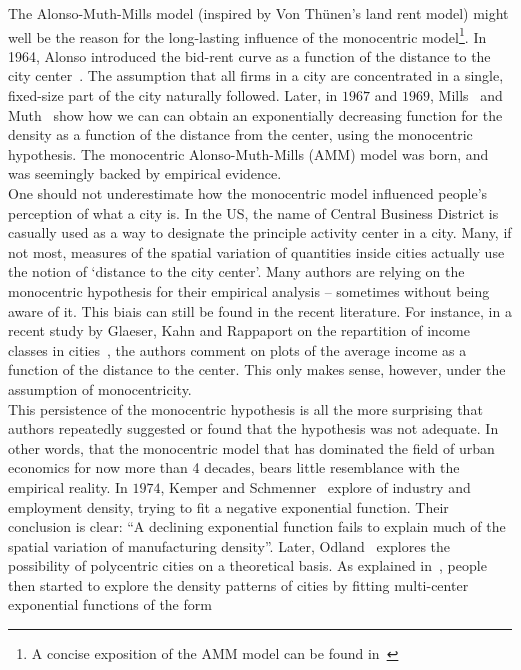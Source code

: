 The Alonso-Muth-Mills model (inspired by Von Th\"unen's land rent model)  might
well be the reason for the long-lasting influence of the monocentric
model\footnote{A concise exposition of the AMM model can be found
in~\cite{Brueckner:1987,Fujita:1989}}. In 1964, Alonso introduced the bid-rent
curve as a function of the distance to the city center~\cite{Alonso:1964}. The
assumption that all firms in a city are concentrated in a single, fixed-size
part of the city naturally followed. Later, in $1967$ and $1969$,
Mills~\cite{Mills:1967} and Muth~\cite{Muth:1969} show how we can can obtain an
exponentially decreasing function for the density as a function of the distance
from the center, using the monocentric hypothesis. The monocentric
Alonso-Muth-Mills (AMM) model was born, and was seemingly backed by empirical
evidence.\\


One should not underestimate how the monocentric model influenced people's
perception of what a city is. In the US, the name of Central Business District
is casually used as a way to designate the principle activity center in a city.
Many, if not most, measures of the spatial variation of quantities inside cities
actually use the notion of `distance to the city center'. Many authors are
relying on the monocentric hypothesis for their empirical analysis -- sometimes
without being aware of it. This biais can still be found in the recent
literature. For instance, in a recent study by Glaeser, Kahn and Rappaport on the
repartition of income classes in cities~\cite{Glaeser:2008}, the authors comment
on plots of the average income as a function of the distance to the center. This
only makes sense, however, under the assumption of monocentricity.\\


This persistence of the monocentric hypothesis is all the more surprising that
authors repeatedly suggested or found that the hypothesis was not adequate. In
other words, that the monocentric model that has dominated the field of urban
economics for now more than 4 decades, bears little resemblance with the
empirical reality. In
$1974$, Kemper and Schmenner~\cite{Kemper:1974} explore of industry and
employment density, trying to fit a negative exponential function. Their
conclusion is clear: ``A declining exponential function fails to explain much of
the spatial variation of manufacturing density''. Later,
Odland~\cite{Odland:1978} explores the possibility of polycentric cities on a
theoretical basis. As explained in~\cite{Griffith:1981}, people then started to
explore the density patterns of cities by fitting multi-center exponential
functions of the form

